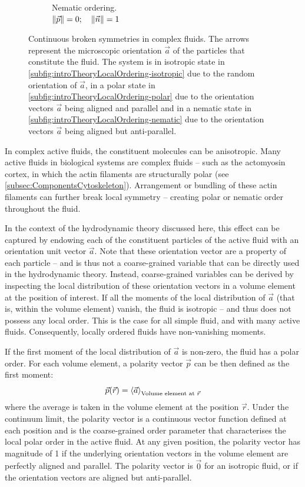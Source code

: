 \begin{figure}
\begin{subfigure}{0.25\textwidth}
    \caption{Nematic ordering.\\$\norm{\vec{p}} = 0;\quad \norm{\vec{n}} = 1$}
    \label{subfig:introTheoryLocalOrdering-nematic}
\end{subfigure}
\caption[Continuous broken symmetries in complex fluids]{Continuous broken symmetries in complex fluids. The arrows represent the microscopic orientation $\vec{a}$ of the particles that constitute the fluid. The system is in isotropic state in \autoref{subfig:introTheoryLocalOrdering-isotropic} due to the random orientation of $\vec{a}$, in a polar state in \autoref{subfig:introTheoryLocalOrdering-polar} due to the orientation vectors $\vec{a}$ being aligned and parallel and in a nematic state in \autoref{subfig:introTheoryLocalOrdering-nematic} due to the orientation vectors $\vec{a}$ being aligned but anti-parallel.}
\label{fig:introTheoryLocalOrdering}
\end{figure}

In complex active fluids, the constituent molecules can be anisotropic. Many active fluids in biological systems are complex fluids -- such as the actomyosin cortex, in which the actin filaments are structurally polar (see \autoref{subsec:ComponentsCytoskeleton}). Arrangement or bundling of these actin filaments can further break local symmetry -- creating polar or nematic order throughout the fluid. 

In the context of the hydrodynamic theory discussed here, this effect can be captured by endowing each of the constituent particles of the active fluid with an orientation unit vector $\vec{a}$. Note that these orientation vector are a property of each particle -- and is thus not a coarse-grained variable that can be directly used in the hydrodynamic theory. Instead, coarse-grained variables can be derived by inspecting the local distribution of these orientation vectors in a volume element at the position of interest. If all the moments of the local distribution of $\vec{a}$ (that is, within the volume element) vanish, the fluid is isotropic -- and thus does not possess any local order. This is the case for all simple fluid, and with many active fluids. Consequently, locally ordered fluids have non-vanishing moments. 

If the first moment of the local distribution of $\vec{a}$ is non-zero, the fluid has a polar order. For each volume element, a polarity vector $\vec{p}$ can be then defined as the first moment:
\begin{equation}\label{eq:introPolarityVectorDefine}
    \vec{p}(\vec{r}) = \expval{\vec{a}}_{\textrm{Volume element at }\vec{r}}
\end{equation}
where the average is taken in the volume element at the position $\vec{r}$. Under the continuum limit, the polarity vector is a continuous vector function defined at each position and is the coarse-grained order parameter that characterises the local polar order in the active fluid. At any given position, the polarity vector has magnitude of \num{1} if the underlying orientation vectors in the volume element are perfectly aligned and parallel. The polarity vector is $\vec{0}$ for an isotropic fluid, or if the orientation vectors are aligned but anti-parallel. 

